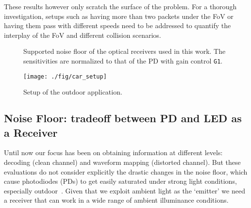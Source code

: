 \documentclass[10pt]{sig-alternate-05-2015}
\begin{document}
These results however only scratch the surface of the problem. For a thorough investigation, setups such as having more than two packets under the FoV or having them pass with different speeds need to be addressed to quantify the interplay of the FoV and different collision scenarios. 



\begin{figure}[!t]
	\begin{minipage}[t]{0.57\linewidth}
		\vspace{-31.5mm}
		\caption{Supported noise floor of the optical receivers used in this work. The sensitivities are normalized to that of the PD with gain control {\tt G1}.}
		\label{fig_noise_floor} \vspace{-4mm}
	\end{minipage}\hfill \begin{minipage}[t]{.4\linewidth}
\centering
		\texttt{[image: ./fig/car\_setup]}
		\vspace{-2mm}
		\caption{Setup of the outdoor application.}
		\label{fig_setup_outdoor_app}
		\vspace{-4mm}
	\end{minipage} 
\end{figure}

\subsection{Noise Floor: tradeoff between PD and LED as a Receiver}\label{subsec:noise_floor}

Until now our focus has been on obtaining information  at different levels: decoding (clean channel) and waveform mapping (distorted channel). But these evaluations do not consider explicitly the drastic changes in the noise floor, which cause photodiodes (PDs) to get easily saturated under strong light conditions, especially outdoor~\cite{Liu:2011}. Given that we exploit ambient light as the `emitter'  we need a receiver that can work in a wide range of ambient illuminance conditions. 
\end{document}
